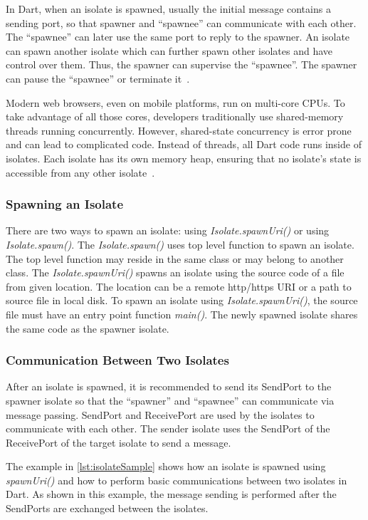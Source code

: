   In Dart, when an isolate is spawned, usually the initial message contains a sending port, so that spawner and “spawnee” can communicate with each other. The “spawnee” can later use the same port to reply to the spawner. An isolate can spawn another isolate which can further spawn other isolates and have control over them. Thus, the spawner can supervise the “spawnee”. The spawner can pause the “spawnee” or terminate it~\cite{dartApiIsolate}.

  Modern web browsers, even on mobile platforms, run on multi-core CPUs. To take advantage of all those cores, developers traditionally use shared-memory threads running concurrently. However, shared-state concurrency is error prone and can lead to complicated code.
  Instead of threads, all Dart code runs inside of isolates. Each isolate has its own memory heap, ensuring that no isolate’s state is accessible from any other isolate~\parencite{laddWalrath}.

  \subsubsection{Spawning an Isolate}
    There are two ways to spawn an isolate: using \emph{Isolate.spawnUri()} or using \emph{Isolate.spawn()}. The \emph{Isolate.spawn()} uses top level function to spawn an isolate. The top level function may reside in the same class or may belong to another class. The \emph{Isolate.spawnUri()} spawns an isolate using the source code of a file from given location. The location can be a remote http/https URI or a path to source file in local disk. To spawn an isolate using \emph{Isolate.spawnUri()}, the source file must have an entry point function \emph{main()}.
    The newly spawned isolate shares the same code as the spawner isolate\cite{dartApiIsolate}.

  \subsubsection{Communication Between Two Isolates}
  After an isolate is spawned, it is recommended to send its SendPort to the spawner isolate so that the “spawner” and “spawnee” can communicate via message passing. SendPort and ReceivePort are used by the isolates to communicate with each other. The sender isolate uses the SendPort of the ReceivePort of the target isolate to send a message.

  The example in \autoref{lst:isolateSample} shows how an isolate is spawned using \emph{spawnUri()} and how to perform basic communications between two isolates in Dart. As shown in this example, the message sending is performed after the SendPorts are exchanged between the isolates.

